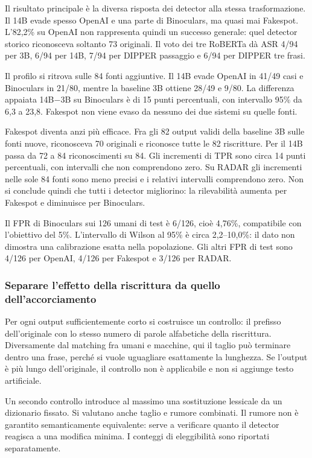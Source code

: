 Il risultato principale è la diversa risposta dei detector alla stessa trasformazione. Il 14B evade spesso OpenAI e una parte di Binoculars, ma quasi mai Fakespot. L'82,2\% su OpenAI non rappresenta quindi un successo generale: quel detector storico riconosceva soltanto 73 originali. Il voto dei tre RoBERTa dà ASR 4/94 per 3B, 6/94 per 14B, 7/94 per DIPPER passaggio e 6/94 per DIPPER tre frasi.

Il profilo si ritrova sulle 84 fonti aggiuntive. Il 14B evade OpenAI in 41/49 casi e Binoculars in 21/80, mentre la baseline 3B ottiene 28/49 e 9/80. La differenza appaiata 14B\ensuremath{-}3B su Binoculars è di 15 punti percentuali, con intervallo 95\% da 6,3 a 23,8. Fakespot non viene evaso da nessuno dei due sistemi su quelle fonti.

Fakespot diventa anzi più efficace. Fra gli 82 output validi della baseline 3B sulle fonti nuove, riconosceva 70 originali e riconosce tutte le 82 riscritture. Per il 14B passa da 72 a 84 riconoscimenti su 84. Gli incrementi di TPR sono circa 14 punti percentuali, con intervalli che non comprendono zero. Su RADAR gli incrementi nelle sole 84 fonti sono meno precisi e i relativi intervalli comprendono zero. Non si conclude quindi che tutti i detector migliorino: la rilevabilità aumenta per Fakespot e diminuisce per Binoculars.

Il FPR di Binoculars sui 126 umani di test è 6/126, cioè 4,76\%, compatibile con l'obiettivo del 5\%. L'intervallo di Wilson al 95\% è circa 2,2--10,0\%: il dato non dimostra una calibrazione esatta nella popolazione. Gli altri FPR di test sono 4/126 per OpenAI, 4/126 per Fakespot e 3/126 per RADAR.

\subsubsection{Separare l'effetto della riscrittura da quello dell'accorciamento}\label{separare-leffetto-della-riscrittura-da-quello-dellaccorciamento}

Per ogni output sufficientemente corto si costruisce un controllo: il prefisso dell'originale con lo stesso numero di parole alfabetiche della riscrittura. Diversamente dal matching fra umani e macchine, qui il taglio può terminare dentro una frase, perché si vuole uguagliare esattamente la lunghezza. Se l'output è più lungo dell'originale, il controllo non è applicabile e non si aggiunge testo artificiale.

Un secondo controllo introduce al massimo una sostituzione lessicale da un dizionario fissato. Si valutano anche taglio e rumore combinati. Il rumore non è garantito semanticamente equivalente: serve a verificare quanto il detector reagisca a una modifica minima. I conteggi di eleggibilità sono riportati separatamente.

